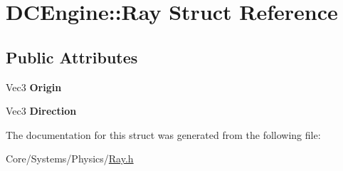 \hypertarget{structDCEngine_1_1Ray}{\section{D\-C\-Engine\-:\-:Ray Struct Reference}
\label{structDCEngine_1_1Ray}
}
\subsection*{Public Attributes}
\begin{DoxyCompactItemize}
\item 
\hypertarget{structDCEngine_1_1Ray_a1814a8a686ca61348ef179a993f9c1e2}{Vec3 {\bfseries Origin}}\label{structDCEngine_1_1Ray_a1814a8a686ca61348ef179a993f9c1e2}

\item 
\hypertarget{structDCEngine_1_1Ray_a2aeae2caf3796c93f8a20f3bf7978464}{Vec3 {\bfseries Direction}}\label{structDCEngine_1_1Ray_a2aeae2caf3796c93f8a20f3bf7978464}

\end{DoxyCompactItemize}


The documentation for this struct was generated from the following file\-:\begin{DoxyCompactItemize}
\item 
Core/\-Systems/\-Physics/\hyperlink{Ray_8h}{Ray.\-h}\end{DoxyCompactItemize}

